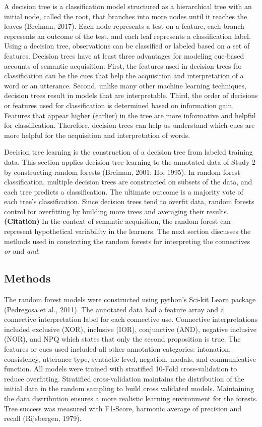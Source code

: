 \documentclass[,man,floatsintext]{apa6}
\begin{document}
A decision tree is a classification model structured as a hierarchical tree with an initial node, called the root, that branches into more nodes until it reaches the leaves (Breiman, 2017). Each node represents a test on a feature, each branch represents an outcome of the test, and each leaf represents a classification label. Using a decision tree, observations can be classified or labeled based on a set of features. Decision trees have at least three advantages for modeling cue-based accounts of semantic acquisition. First, the features used in decision trees for classification can be the cues that help the acquisition and interpretation of a word or an utterance. Second, unlike many other machine learning techniques, decision trees result in models that are interpretable. Third, the order of decisions or features used for classification is determined based on information gain. Features that appear higher (earlier) in the tree are more informative and helpful for classification. Therefore, decision trees can help us understand which cues are more helpful for the acquisition and interpretation of words.

Decision tree learning is the construction of a decision tree from labeled training data. This section applies decision tree learning to the annotated data of Study 2 by constructing random forests (Breiman, 2001; Ho, 1995). In random forest classification, multiple decision trees are constructed on subsets of the data, and each tree predicts a classification. The ultimate outcome is a majority vote of each tree's classification. Since decision trees tend to overfit data, random forests control for overfitting by building more trees and averaging their results. \textbf{(Citation)} In the context of semantic acquisition, the random forest can represent hypothetical variability in the learners. The next section discusses the methods used in constrcting the random forests for interpreting the connectives \emph{or} and \emph{and}.

\hypertarget{methods-2}{%
\subsection{Methods}\label{methods-2}}

The random forest models were constructed using python's Sci-kit Learn package (Pedregosa et al., 2011). The annotated data had a feature array and a connective interpretation label for each connective use. Connective interpretations included exclusive (XOR), inclusive (IOR), conjunctive (AND), negative inclusive (NOR), and NPQ which states that only the second proposition is true. The features or cues used included all other annotation categories: intonation, consistency, utterance type, syntactic level, negation, modals, and communicative function. All models were trained with stratified 10-Fold cross-validation to reduce overfitting. Stratified cross-validation maintains the distribution of the initial data in the random sampling to build cross validated models. Maintaining the data distribution ensures a more realistic learning environment for the forests. Tree success was measured with F1-Score, harmonic average of precision and recall (Rijsbergen, 1979).
\end{document}
